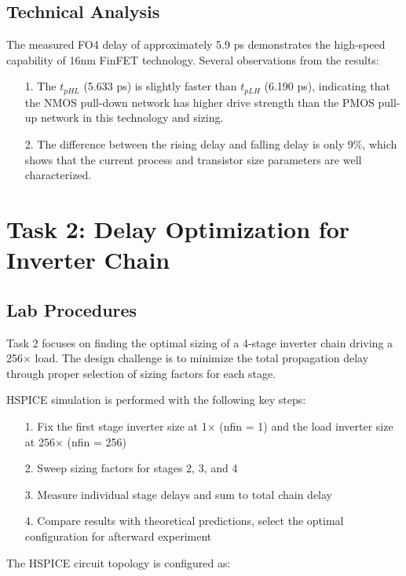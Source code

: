\documentclass[UTF8,12pt,a4paper]{ctexart}
\begin{document}
\subsection{Technical Analysis}

The measured FO4 delay of approximately 5.9 ps demonstrates the high-speed capability of 16nm FinFET technology. Several observations from the results:

\begin{itemize}
    \item[1.] The $t_{pHL}$ (5.633 ps) is slightly faster than $t_{pLH}$ (6.190 ps), indicating that the NMOS pull-down network has higher drive strength than the PMOS pull-up network in this technology and sizing.
    \item[2.] The difference between the rising delay and falling delay is only 9\%, which shows that the current process and transistor size parameters are well characterized.
\end{itemize}

\newpage
\section{Task 2: Delay Optimization for Inverter Chain}

\subsection{Lab Procedures}

Task 2 focuses on finding the optimal sizing of a 4-stage inverter chain driving a 256× load. The design challenge is to minimize the total propagation delay through proper selection of sizing factors for each stage.

HSPICE simulation is performed with the following key steps:

\begin{enumerate}
    \item[1. ] Fix the first stage inverter size at 1× (nfin = 1) and the load inverter size at 256× (nfin = 256)
    \item[2. ] Sweep sizing factors for stages 2, 3, and 4
    \item[3. ] Measure individual stage delays and sum to total chain delay
    \item[4. ] Compare results with theoretical predictions, select the optimal configuration for afterward experiment
\end{enumerate}

The HSPICE circuit topology is configured as:
\end{document}
